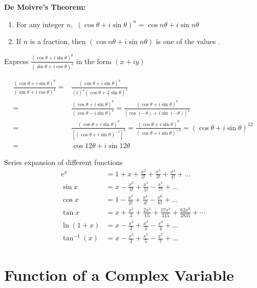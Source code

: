 \begin{theorem}
	\textbf{De Moivre's Theorem:}
	\begin{enumerate}
		\item For any integer $n,$ $(\cos \theta+i \sin \theta)^{n}=\cos n \theta+i \sin n \theta$
		\item 	If $n$ is a fraction, then $(\cos n \theta+i \sin n \theta)$ is one of the values .
	\end{enumerate}
\end{theorem}
\begin{exercise}
  Express $\frac{(\cos \theta+i \sin \theta)^{8}}{(\sin \theta+i \cos \theta)^{4}}$ in the form $(x+i y)$
\end{exercise}
\begin{answer}
	$$
	\begin{aligned}
	\frac{(\cos \theta+i \sin \theta)^{8}}{(\sin \theta+i \cos \theta)^{4}}=&\frac{(\cos \theta+i \sin \theta)^{8}}{(i)^{4}\left(\cos \theta+\frac{1}{i} \sin \theta\right)^{4}} \\
	=& \frac{(\cos \theta+i \sin \theta)^{8}}{(\cos \theta-i \sin \theta)^{4}}=\frac{(\cos \theta+i \sin \theta)^{8}}{[\cos (-\theta)+i \sin (-\theta)]^{4}} \\
	=& \frac{(\cos \theta+i \sin \theta)^{8}}{\left[(\cos \theta+i \sin \theta)^{-1}\right]^{4}}=\frac{(\cos \theta+i \sin \theta)^{8}}{(\cos \theta+i \sin \theta)^{-4}}=(\cos \theta+i \sin \theta)^{12} \\
	=& \cos 12 \theta+i \sin 12 \theta
	\end{aligned}
	$$
\end{answer}
\begin{note}
	Series expansion of different functions
	\begin{align*}
	e^{x}&=1+x+\frac{x^{2}}{2 !}+\frac{x^{3}}{3 !}+\frac{x^{4}}{4 !}+\ldots \\
	\sin x&=x-\frac{x^{3}}{3 !}+\frac{x^{5}}{5 !}-\frac{x^{7}}{7 !}+\ldots \\
	\cos x&=1-\frac{x^{2}}{2 !}+\frac{x^{4}}{4 !}-\frac{x^{6}}{6 !}+\ldots \\
	\tan x&=x+\frac{x^{3}}{3}+\frac{2 x^{5}}{15}+\frac{17 x^{7}}{315}+\frac{62 x^{9}}{2835} +\cdots\\
	\ln (1+x)&=x-\frac{x^{2}}{2}+\frac{x^{3}}{3}-\frac{x^{4}}{4}+\ldots \\
    \tan ^{-1}(x)&=x-\frac{x^{3}}{3}+\frac{x^{5}}{5}-\frac{x^{7}}{7}+\ldots
	\end{align*}
	\end{note}
	\section{Function of a Complex Variable}
